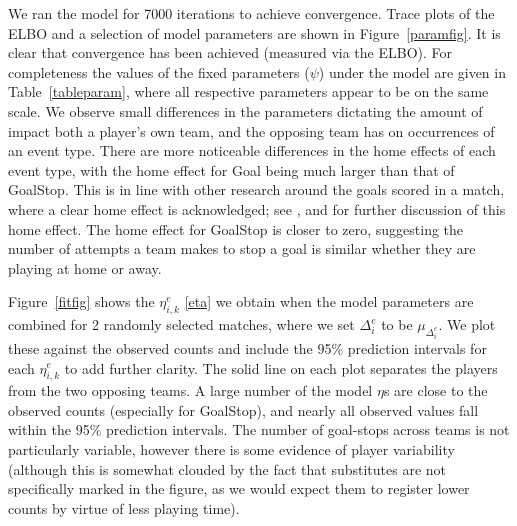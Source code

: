 \documentclass[11pt,a4paper]{article}
\begin{document}
We ran the model for 7000 iterations to achieve convergence. Trace 
plots of the ELBO and a selection of model parameters are shown in 
Figure~\ref{paramfig}. It is clear that convergence has been achieved 
(measured via the ELBO). For completeness the values of the fixed parameters 
($\psi$) under the model are given in Table~\ref{tableparam}, where 
all respective parameters appear to be on the same scale. We observe small 
differences in the parameters dictating the amount of impact both a 
player's own team, and the opposing team has on occurrences of an 
event type. There are more noticeable differences in the home effects 
of each event type, with the home effect for Goal being much larger 
than that of GoalStop. This is in line with other research around the 
goals scored in a match, where a clear home effect is acknowledged; 
see \cite{dixon_1997}, \cite{karlis_2003} and \cite{baio_2010} 
for further discussion of this home effect. The home effect for 
GoalStop is closer to zero, suggesting the number of attempts a team 
makes to stop a goal is similar whether they are playing at home or 
away. 



Figure~\ref{fitfig} shows the $\eta_{i,k}^{e}$ \eqref{eta} we obtain when the 
model parameters are combined for 2 randomly selected matches, where we 
set $\Delta_i^{e}$ to be $\mu_{\Delta_i^{e}}$. We plot these 
against the observed counts and include the 95\% prediction intervals 
for each $\eta_{i,k}^{e}$ to add further clarity. The solid line on 
each plot separates the players from the two opposing teams. A large 
number of the model $\eta$s are close to the observed counts 
(especially for GoalStop), and nearly all observed values fall within 
the 95\% prediction intervals. The 
number of goal-stops across teams is not particularly variable, 
however there is some evidence of player variability (although this is 
somewhat clouded by the fact that substitutes are not specifically 
marked in the figure, as we would expect them to register lower counts by virtue of 
less playing time).
\end{document}
